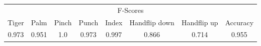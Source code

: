 \documentclass{standalone}
\begin{document}
 
 \begin{tabular}{|c|c|c|c|c|c|c ||c|}
\cline{1-8}\multicolumn{8}{|c|}{F-Scores} \\ 
\cline{1-8}Tiger & Palm & Pinch & Punch & Index & Handflip down & Handflip up & Accuracy\\ 
\cline{1-8}0.973 & 0.951 & 1.0 & 0.973 & 0.997 & 0.866 & 0.714 & 0.955\\ 
 \cline{1-8}\hline \end{tabular}
 
\end{document}
